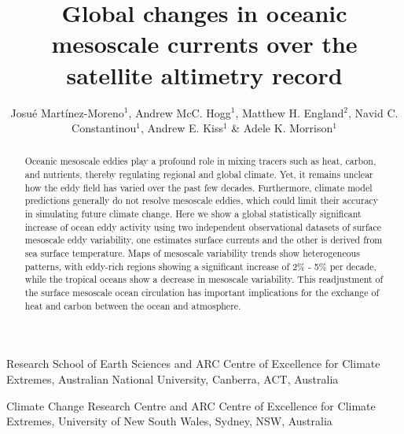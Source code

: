 \documentclass{nature}
\title{Global changes in oceanic mesoscale currents over the satellite altimetry record}
\author{Josu\'e Mart\'inez-Moreno$^1$, Andrew McC. Hogg$^1$, Matthew H. England$^2$, Navid C. Constantinou$^1$, Andrew E. Kiss$^1$  \& Adele K. Morrison$^1$}
\begin{document}
	
\maketitle

\renewcommand{\thefootnote}{\roman{footnote}}

\begin{affiliations}
 \item Research School of Earth Sciences and ARC Centre of Excellence for Climate Extremes, Australian National University, Canberra, ACT, Australia
 \item Climate Change Research Centre and ARC Centre of Excellence for Climate Extremes, University of New South Wales, Sydney, NSW, Australia
\end{affiliations}

\begin{abstract}
	Oceanic mesoscale eddies play a profound role in mixing tracers such as heat, carbon, and nutrients, thereby regulating regional and global climate. Yet, it remains unclear how the eddy field has varied over the past few decades. Furthermore, climate model predictions generally do not resolve mesoscale eddies, which could limit their accuracy in simulating future climate change. Here we show a global statistically significant increase of ocean eddy activity using two independent observational datasets of surface mesoscale eddy variability, one estimates surface currents and the other is derived from sea surface temperature. Maps of mesoscale variability trends show heterogeneous patterns, with eddy-rich regions showing a significant increase of 2\% - 5\% per decade, while the tropical oceans show a decrease in mesoscale variability. This readjustment of the surface mesoscale ocean circulation has important implications for the exchange of heat and carbon between the ocean and atmosphere.
\end{abstract}
\end{document}
